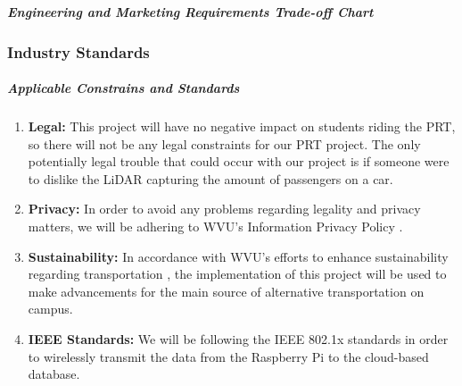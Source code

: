 \subparagraph{Engineering and Marketing Requirements Trade-off Chart}


\subsubsection{Industry Standards}
\subparagraph{Applicable Constrains and Standards}
\begin{enumerate}
    \item \textbf{Legal:} This project will have no negative impact on students riding the PRT, so there will not be any legal constraints for our PRT project. The only potentially legal trouble that could occur with our project is if someone were to dislike the LiDAR capturing the amount of passengers on a car.
    \item \textbf{Privacy:} In order to avoid any problems regarding legality and privacy matters, we will be adhering to WVU’s Information Privacy Policy \cite{privacyPolicy}.
    \item \textbf{Sustainability:} In accordance with WVU’s efforts to enhance sustainability regarding transportation \cite{transportation}, the implementation of this project will be used to make advancements for the main source of alternative transportation on campus.
    \item \textbf{IEEE Standards:} We will be following the IEEE 802.1x \cite{ieee} standards in order to wirelessly transmit the data from the Raspberry Pi to the cloud-based database.
\end{enumerate}